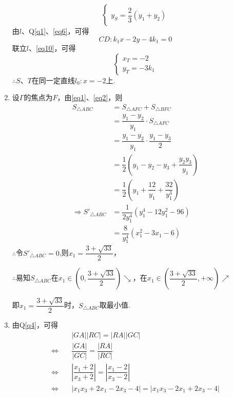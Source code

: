 \documentclass[UTF8, 12pt, a4paper]{ctexart}
\newcommand \qref[1]{Q\ref{#1}}
\begin{document}
\begin{enumerate}
\begin{equation}
\begin{cases}
    y_S=\dfrac{2}{3}\left(y_1+y_2\right)
    \end{cases}\label{eq9}
\end{equation}
由$l$、\qref{q1}、\eqref{eq6}，可得
\begin{equation}
    CD:k_1x-2y-4k_1=0\label{eq10}
\end{equation}
联立$l$、\eqref{eq10}，可得
\begin{equation}
    \begin{cases}
    x_T=-2\\
    y_T=-3k_1\label{eq11}
    \end{cases}
\end{equation}
$\therefore S$、$T$在同一定直线$l_0:x=-2$上.
\item \label{q5}设$\Gamma$的焦点为$F$，由\eqref{eq1}、\eqref{eq2}，则
\begin{align*}
    S_{\triangle ABC}&=S_{\triangle AFC}+S_{\triangle BFC}\\
    &=\dfrac{y_1-y_2}{y_1}\cdot S_{\triangle AFC}\\
    &=\dfrac{y_1-y_2}{y_1}\cdot\dfrac{y_1-y_3}{2}\\
    &=\dfrac{1}{2}\left(y_1-y_2-y_3+\dfrac{y_2y_3}{y_1}\right)\\
    &=\dfrac{1}{2}\left(y_1+\dfrac{12}{y_1}+\dfrac{32}{y_1^3}\right)\\
    \Rightarrow S'_{\triangle ABC}&=\dfrac{1}{2y_1^4}\left(y_1^4-12y_1^2-96\right)\\
    &=\dfrac{8}{y_1^4}\left(x_1^2-3x_1-6\right)
\end{align*}
$\therefore$令$S'_{\triangle ABC}=0$,则$x_1=\dfrac{3+\sqrt{33}}{2}$，\par
$\therefore$易知$S_{\triangle ABC}$在$x_1\in\left(0,\dfrac{3+\sqrt{33}}{2} \right)\searrow$，在$x_1\in\left(\dfrac{3+\sqrt{33}}{2},+\infty \right)\nearrow$\par
即$x_1=\dfrac{3+\sqrt{33}}{2}$时，$S_{\triangle ABC}$取最小值.
\item \label{q6}由\qref{q4}，可得
\begin{align*}
&\left|GA \right|\left|RC \right|=\left|RA \right|\left|GC \right|\\
\Leftrightarrow\quad&\dfrac{\left|GA \right|}{\left|GC \right|}=\dfrac{\left|RA \right|}{\left|RC \right|}\\
\Leftrightarrow\quad&\left|\dfrac{x_1+2}{x_3+2} \right|=\left|\dfrac{x_1-2}{x_3-2} \right|\\
\Leftrightarrow\quad&\left|x_1x_3+2x_1-2x_3-4 \right|=\left|x_1x_3-2x_1+2x_3-4 \right|
\end{align*}

\end{enumerate}
\end{document}
